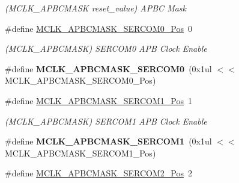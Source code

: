 \begin{DoxyCompactItemize}
\begin{DoxyCompactList}\small\item\em (M\+C\+L\+K\+\_\+\+A\+P\+B\+C\+M\+A\+S\+K reset\+\_\+value) A\+P\+B\+C Mask \end{DoxyCompactList}\item 
\hypertarget{group___s_a_m_l21___m_c_l_k_ga374f42f8901b252860e3cc1d2624caf4}{}\#define \hyperlink{group___s_a_m_l21___m_c_l_k_ga374f42f8901b252860e3cc1d2624caf4}{M\+C\+L\+K\+\_\+\+A\+P\+B\+C\+M\+A\+S\+K\+\_\+\+S\+E\+R\+C\+O\+M0\+\_\+\+Pos}~0\label{group___s_a_m_l21___m_c_l_k_ga374f42f8901b252860e3cc1d2624caf4}

\begin{DoxyCompactList}\small\item\em (M\+C\+L\+K\+\_\+\+A\+P\+B\+C\+M\+A\+S\+K) S\+E\+R\+C\+O\+M0 A\+P\+B Clock Enable \end{DoxyCompactList}\item 
\hypertarget{group___s_a_m_l21___m_c_l_k_ga670e465e481f03a5589fc4ad7ae7a70f}{}\#define {\bfseries M\+C\+L\+K\+\_\+\+A\+P\+B\+C\+M\+A\+S\+K\+\_\+\+S\+E\+R\+C\+O\+M0}~(0x1ul $<$$<$ M\+C\+L\+K\+\_\+\+A\+P\+B\+C\+M\+A\+S\+K\+\_\+\+S\+E\+R\+C\+O\+M0\+\_\+\+Pos)\label{group___s_a_m_l21___m_c_l_k_ga670e465e481f03a5589fc4ad7ae7a70f}

\item 
\hypertarget{group___s_a_m_l21___m_c_l_k_ga5b44931d7ee6f6e9db11c722308df358}{}\#define \hyperlink{group___s_a_m_l21___m_c_l_k_ga5b44931d7ee6f6e9db11c722308df358}{M\+C\+L\+K\+\_\+\+A\+P\+B\+C\+M\+A\+S\+K\+\_\+\+S\+E\+R\+C\+O\+M1\+\_\+\+Pos}~1\label{group___s_a_m_l21___m_c_l_k_ga5b44931d7ee6f6e9db11c722308df358}

\begin{DoxyCompactList}\small\item\em (M\+C\+L\+K\+\_\+\+A\+P\+B\+C\+M\+A\+S\+K) S\+E\+R\+C\+O\+M1 A\+P\+B Clock Enable \end{DoxyCompactList}\item 
\hypertarget{group___s_a_m_l21___m_c_l_k_ga98ec28736c0b1f9428ee9dfc1884eeff}{}\#define {\bfseries M\+C\+L\+K\+\_\+\+A\+P\+B\+C\+M\+A\+S\+K\+\_\+\+S\+E\+R\+C\+O\+M1}~(0x1ul $<$$<$ M\+C\+L\+K\+\_\+\+A\+P\+B\+C\+M\+A\+S\+K\+\_\+\+S\+E\+R\+C\+O\+M1\+\_\+\+Pos)\label{group___s_a_m_l21___m_c_l_k_ga98ec28736c0b1f9428ee9dfc1884eeff}

\item 
\hypertarget{group___s_a_m_l21___m_c_l_k_ga51332d6c4ece3ae0b4039bce69b8a7f7}{}\#define \hyperlink{group___s_a_m_l21___m_c_l_k_ga51332d6c4ece3ae0b4039bce69b8a7f7}{M\+C\+L\+K\+\_\+\+A\+P\+B\+C\+M\+A\+S\+K\+\_\+\+S\+E\+R\+C\+O\+M2\+\_\+\+Pos}~2\label{group___s_a_m_l21___m_c_l_k_ga51332d6c4ece3ae0b4039bce69b8a7f7}


\end{DoxyCompactItemize}
